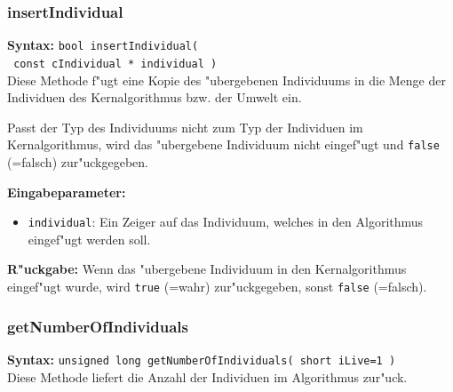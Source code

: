 \subsubsection{insertIndividual}

\textbf{Syntax:} \verb|bool insertIndividual(| \\\verb| const cIndividual * individual )| \\

Diese Methode f"ugt eine Kopie des "ubergebenen Individuums in die Menge der Individuen des Kernalgorithmus bzw. der Umwelt ein.

Passt der Typ des Individuums nicht zum Typ der Individuen im Kernalgorithmus, wird das "ubergebene Individuum nicht eingef"ugt und \verb|false| (=falsch) zur"uckgegeben.

\bigskip\noindent
\textbf{Eingabeparameter:}
\begin{itemize}
 \item \verb|individual|: Ein Zeiger auf das Individuum, welches in den Algorithmus eingef"ugt werden soll.
\end{itemize}

\bigskip\noindent
\textbf{R"uckgabe:} Wenn das "ubergebene Individuum in den Kernalgorithmus eingef"ugt wurde, wird \verb|true| (=wahr) zur"uckgegeben, sonst \verb|false| (=falsch).


\subsubsection{getNumberOfIndividuals}

\textbf{Syntax:} \verb|unsigned long getNumberOfIndividuals( short iLive=1 )| \\

Diese Methode liefert die Anzahl der Individuen im Algorithmus zur"uck.

